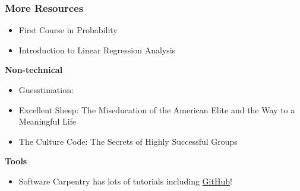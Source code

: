 \documentclass[serif, xcolor={dvipsnames}]{beamer} %
\begin{document}
\begin{frame}[t]
\frametitle{More Resources}

\begin{itemize}
\item {\scriptsize First Course in Probability~\citep{ross1976first}}
\item {\scriptsize Introduction to Linear Regression Analysis~\citep{montgomery2021introduction}}
\end{itemize}
{\bf \scriptsize  Non-technical}
\begin{itemize}
\item {\scriptsize Guesstimation:~\citep{weinstein2008guesstimation}}
\item {\scriptsize Excellent Sheep: The Miseducation of the American Elite and the Way to a Meaningful Life~\citep{sheep}}
\item {\scriptsize The Culture Code: The Secrets of Highly Successful Groups~\citep{CultureCode}}
\end{itemize}

{\bf \scriptsize  Tools}
\begin{itemize}
\item {\scriptsize Software Carpentry has lots of tutorials including \href{https://swcarpentry.github.io/git-novice/}{GitHub}!}
\end{itemize}
\end{frame}
\end{document}
